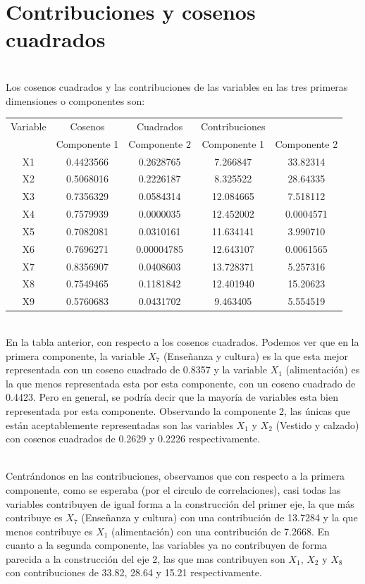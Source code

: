\documentclass[report,oneside]{revcoles}
\begin{document}
\pagebreak
\section{Contribuciones y cosenos cuadrados}
~\\Los cosenos cuadrados y las contribuciones de las variables en las tres primeras dimensiones o componentes son:
\begin{center}
\begin{tabular}{|c|cc|cc|}
\hline 
 Variable &Cosenos & Cuadrados  &  Contribuciones  &   \\ 
 &Componente 1 & Componente 2  & Componente 1 & Componente 2 \\ 
X1 &0.4423566& 0.2628765& 7.266847& 33.82314 \\
X2 &0.5068016 & 0.2226187& 8.325522& 28.64335 \\
X3 &0.7356329 &0.0584314& 12.084665& 7.518112 \\
X4 &0.7579939 &0.0000035 & 12.452002& 0.0004571 \\
X5 &0.7082081 &0.0310161 & 11.634141& 3.990710 \\
X6 &0.7696271 &0.00004785& 12.643107& 0.0061565 \\
X7 &0.8356907 &0.0408603& 13.728371& 5.257316 \\
X8 &0.7549465 &0.1181842& 12.401940& 15.20623 \\
X9 &0.5760683 &0.0431702& 9.463405& 5.554519 \\
\hline 
\end{tabular} 
\end{center}

~\\En la tabla anterior, con respecto a los cosenos cuadrados. Podemos ver que en la primera componente, la variable $X_7$ (Enseñanza y cultura) es la que esta mejor representada con un coseno cuadrado de 0.8357 y la variable $X_1$ (alimentación) es la que menos representada esta por esta componente, con un coseno cuadrado de 0.4423. Pero en general, se podría decir que la mayoría de variables esta bien representada por esta componente. Observando la componente 2, las únicas que están aceptablemente representadas son las variables $X_1$ y $X_2$ (Vestido y calzado) con cosenos cuadrados de 0.2629 y 0.2226 respectivamente.

~\\Centrándonos en las contribuciones, observamos que con respecto a la primera componente, como se esperaba (por el circulo de correlaciones), casi todas las variables contribuyen de igual forma a la construcción del primer eje, la que más contribuye es $X_7$ (Enseñanza y cultura) con una contribución de 13.7284 y la que menos contribuye es $X_1$ (alimentación) con una contribución de 7.2668. En cuanto a la segunda componente, las variables ya no contribuyen de forma parecida a la construcción del eje 2, las que mas contribuyen son $X_1$, $X_2$ y $X_8$ con contribuciones de 33.82, 28.64 y 15.21 respectivamente.
\end{document}
